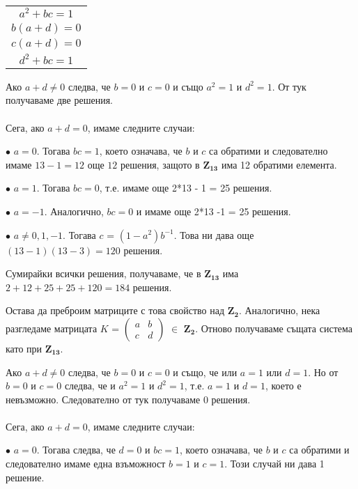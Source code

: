 \documentclass{article}
\begin{document}
\begin{center}
\begin{tabular}{ c }

 $a^2 + bc = 1$ \\ 
 $b(a + d) = 0$ \\
 $c(a + d) = 0$ \\
 $d^2 + bc = 1$
 
\end{tabular}
\end{center}

\justify
Ако $a + d \neq 0$ следва, че $b = 0$ и $c = 0$ и също $a^2 = 1$ и $d^2 = 1$. От тук получаваме две решения. \\
\\Сега, ако $a + d = 0$, имаме следните случаи:

$\bullet$ $a = 0$. Тогава $bc = 1$, което означава, че $b$ и $c$ са обратими и следователно имаме $13 - 1 = 12$ още $12$ решения, защото в $\mathbf{Z_{13}}$ има 12 обратими елемента.

$\bullet$ $a = 1$. Тогава $bc = 0$, т.е. имаме още 2*13 - 1 = 25 решения.

$\bullet$ $a = -1$. Аналогично, $bc = 0$ и имаме още 2*13 -1 = 25 решения.

$\bullet$ $a \neq 0, 1, -1$. Тогава $c$ = $(1 - a^2)b^{-1}$. Това ни дава още $(13-1)(13-3) = 120$ решения.

\justify
Сумирайки всички решения, получаваме, че в $\mathbf{Z_{13}}$ има $2 + 12 + 25 + 25 + 120 = 184$ решения.

\justify
Остава да преброим матриците с това свойство над $\mathbf{Z_2}$. Аналогично, нека разгледаме матрицата $K$ = $\begin{pmatrix}
                             a & b \\
                             c & d
                         \end{pmatrix}$
                         $\in$ $\mathbf{Z_{2}}$. 
Отново получаваме същата система като при $\mathbf{Z_{13}}$.

\justify
Ако $a + d \neq 0$ следва, че $b = 0$ и $c = 0$ и също, че или $a = 1$ или $d = 1$. Но от $b = 0$ и $c = 0$ следва, че и $a^2 = 1$ и $d^2 = 1$, т.е. $a = 1$ и $d = 1$, което е невъзможно. Следователно от тук получаваме 0 решения. \\
\\Сега, ако $a + d = 0$, имаме следните случаи: 

$\bullet$ $a = 0$. Тогава следва, че $d = 0$ и $bc = 1$, което означава, че $b$ и $c$ са обратими и следователно имаме една взъможност $b = 1$ и $c = 1$. Този случай ни дава 1 решение.
\end{document}
